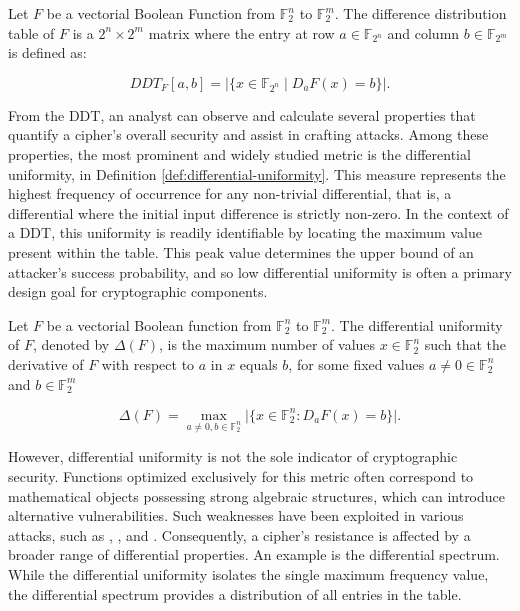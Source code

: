 \begin{definition}
    Let $F$ be a vectorial Boolean Function from $\mathbb{F}_{2}^{n}$ to $\mathbb{F}_{2}^{m}$. The difference distribution table of $F$ is a $2^n \times 2^m$ matrix where the entry at row $a \in \mathbb{F}_{2^n}$ and column $b \in \mathbb{F}_{2^m}$ is defined as:

    \begin{equation}
        DDT_{F}[a, b] = \big|\{x \in \mathbb{F}_{2^n} \mid D_{a}F(x) = b\}\big|.
    \end{equation}
\end{definition}

From the DDT, an analyst can observe and calculate several properties that quantify a cipher's overall security and assist in crafting attacks. Among these properties, the most prominent and widely studied metric is the differential uniformity, in Definition 
\ref{def:differential-uniformity}. This measure represents the highest frequency of occurrence for any non-trivial differential, that is, a differential where the initial input difference is strictly non-zero. In the context of a DDT, this uniformity is readily identifiable by locating the maximum value present within the table. This peak value determines the upper bound of an attacker's success probability, and so low differential uniformity is often a primary design goal for cryptographic components.

\begin{definition}
    \label{def:differential-uniformity}

    Let $F$ be a vectorial Boolean function from $\mathbb{F}_{2}^{n}$ to $\mathbb{F}_{2}^{m}$. The differential uniformity of $F$, denoted by $\Delta(F)$, is the maximum number of values $x \in \mathbb{F}_{2}^{n}$ such that the derivative of $F$ with respect to $a$ in $x$ equals $b$, for some fixed values $a \ne 0 \in \mathbb{F}_{2}^{n}$ and $b \in \mathbb{F}_{2}^{m}$

    \begin{equation}
        \Delta(F) = \max_{a \ne 0, b \in \mathbb{F}_{2}^{n}} \big| \{x \in \mathbb{F}_{2}^{n} : D_{a}F(x) = b\} \big|.
    \end{equation}
\end{definition}

However, differential uniformity is not the sole indicator of cryptographic security. Functions optimized exclusively for this metric often correspond to mathematical objects possessing strong algebraic structures, which can introduce alternative vulnerabilities. Such weaknesses have been exploited in various attacks, such as \cite{JakobsenAndKnudsen1997}, \cite{CourtoisAndPieprzyk2002}, and \cite{CanteautAndVideu2002}. Consequently, a cipher's resistance is affected by a broader range of differential properties. An example is the differential spectrum. While the differential uniformity isolates the single maximum frequency value, the differential spectrum provides a distribution of all entries in the table.

